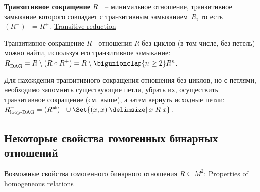 \documentclass[a4paper,10pt]{article}
\begin{document}
\begin{terms}
\begin{terms}
        \item \textbf{Транзитивное сокращение} $R^{-}$ \--- минимальное отношение, транзитивное замыкание которого совпадает с транзитивным замыканием~$R$, то есть $(R^{-})^{+} = R^{+}$.
        \hfill\href{https://en.wikipedia.org/wiki/Transitive_reduction}{Transitive reduction}

        Транзитивное сокращение $R^{-}$ отношения $R$ без циклов (в том числе, без петель) можно найти, используя его транзитивное замыкание: $R^{-}_{\text{DAG}} = R \setminus (R \circ R^{+}) = R \setminus \bigunionclap{n \geq 2} R^n$.

        Для нахождения транзитивного сокращения отношения без циклов, но с петлями, необходимо запомнить существующие петли, убрать их, осуществить транзитивное сокращение (см. выше), а затем вернуть исходные петли: $R^{-}_{\text{loop-DAG}} = (R^{\neq})^{-} \union \Set{(x,x) \given x \rel x}$.
    \end{terms}
\end{terms}


\newpage


\subsection{Некоторые свойства гомогенных бинарных отношений}

Возможные свойства гомогенного бинарного отношения $R \subseteq M^2$:
\hfill\href{https://en.wikipedia.org/wiki/Homogeneous_relation#Properties}{Properties of homogeneous relations}
\end{document}
